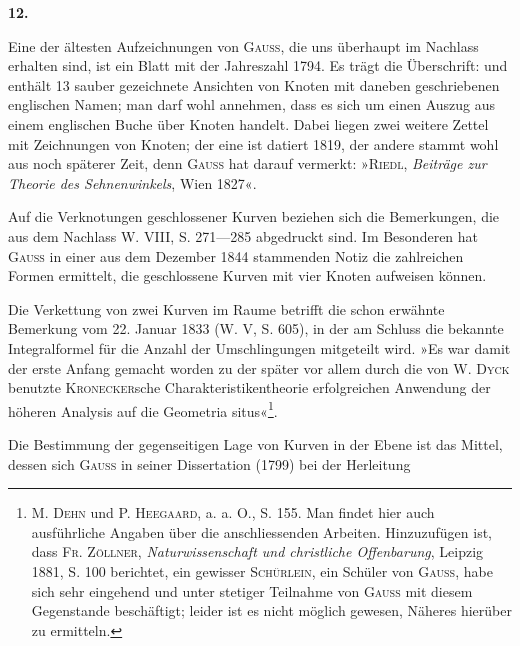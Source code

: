 \clearpage\begingroup{}
\renewcommand{\thefootnote}{\arabic{footnote})}\setcounter{footnote}{0}
\begin{center}
\textbf{12.}\par\smallskip
{}
\end{center}
\noindent\hspace*{\parindent}Eine der ältesten Aufzeichnungen von \textsc{Gauss}, die uns überhaupt im Nachlass
erhalten sind, ist ein Blatt mit der Jahreszahl 1794. Es trägt die Überschrift:
 und enthält 13 sauber gezeichnete Ansichten
von Knoten mit daneben geschriebenen englischen Namen; man darf wohl
annehmen, dass es sich um einen Auszug aus einem englischen Buche über
Knoten handelt. Dabei liegen zwei weitere Zettel mit Zeichnungen von
Knoten; der eine ist datiert 1819, der andere stammt wohl aus noch späterer
Zeit, denn \textsc{Gauss} hat darauf vermerkt: »\textsc{Riedl}, \textit{Beiträge zur Theorie des Sehnenwinkels},
Wien 1827«.
\par
Auf die Verknotungen geschlossener Kurven beziehen sich die Bemerkungen,
die aus dem Nachlass W. VIII, S. 271—285 abgedruckt sind. Im Besonderen
hat \textsc{Gauss} in einer aus dem Dezember 1844 stammenden Notiz die zahlreichen
Formen ermittelt, die geschlossene Kurven mit vier Knoten aufweisen können.
\par
Die Verkettung von zwei Kurven im Raume betrifft die schon erwähnte
Bemerkung vom 22. Januar 1833 (W. V, S. 605), in der am Schluss die bekannte
Integralformel für die Anzahl der Umschlingungen mitgeteilt wird.
»Es war damit der erste Anfang gemacht worden zu der später vor allem
durch die von W. \textsc{Dyck} benutzte \textsc{Kronecker}sche Charakteristikentheorie erfolgreichen
Anwendung der höheren Analysis auf die Geometria situs«\footnote{M. \textsc{Dehn} und P. \textsc{Heegaard}, a. a. O., S. 155. Man findet hier auch ausführliche Angaben über die anschliessenden Arbeiten. Hinzuzufügen ist, dass \textsc{Fr. Zöllner}, \textit{Naturwissenschaft und christliche Offenbarung}, Leipzig 1881, S. 100 berichtet, ein gewisser \textsc{Schürlein}, ein Schüler von \textsc{Gauss}, habe sich sehr eingehend und unter stetiger Teilnahme von \textsc{Gauss} mit diesem Gegenstande beschäftigt; leider ist es nicht möglich gewesen, Näheres hierüber zu ermitteln.}.
\par
Die Bestimmung der gegenseitigen Lage von Kurven in der Ebene ist
das Mittel, dessen sich \textsc{Gauss} in seiner Dissertation (1799) bei der Herleitung
